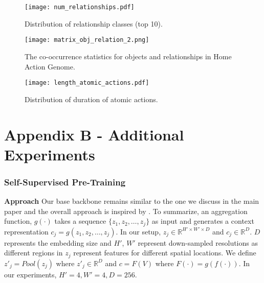 \documentclass[final]{cvpr}
\begin{document}
\begin{figure}[t]
    \begin{center}
    \texttt{[image: num\_relationships.pdf]}
    \caption{Distribution of relationship classes (top 10). \label{fig:rel_dist}}
    \end{center}
\end{figure}

\begin{figure*}[t]
    \begin{center}
    \texttt{[image: matrix\_obj\_relation\_2.png]}
    \caption{The co-occurrence statistics for objects and relationships in Home Action Genome. \label{fig:matrix_obj_rel}}
    \end{center}
\end{figure*}

\begin{figure}[t]
    \begin{center}
    \texttt{[image: length\_atomic\_actions.pdf]}
    \caption{Distribution of duration of atomic actions. \label{fig:dur_dist}}
    \end{center} 
\end{figure}

\renewcommand\thefigure{B.\arabic{figure}}    
\setcounter{figure}{0}   
\renewcommand\thetable{B.\arabic{table}}    
\setcounter{table}{0}   
\section*{Appendix B - Additional Experiments}
\label{sec:experiments}



\subsubsection*{Self-Supervised Pre-Training}

\textbf{Approach} Our base backbone remains similar to the one we discuss in the main paper and the overall approach is inspired by \cite{dpc}. To summarize, an aggregation function, $g(\cdot)$ takes a sequence $\{z_1, z_2, \ldots, z_j\}$ as input and generates a context representation $c_j = g(z_1, z_2, \ldots, z_j)$. In our setup, $z_j \in \mathbb{R}^{H' \times W' \times D}$ and $c_j \in \mathbb{R}^{D}$. $D$ represents the embedding size and $H'$, $W'$ represent down-sampled resolutions as different regions in $z_j$ represent features for different spatial locations. We define $z'_j = Pool(z_j)$ where $z'_j \in \mathbb{R}^{D}$ and $c = F(V)$ where $F(\cdot) = g(f(\cdot))$. In our experiments, $H'=4, W'=4, D=256$.
\end{document}
